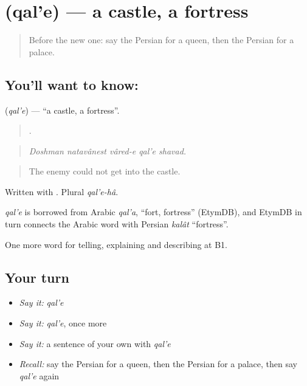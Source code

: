 \section[\texorpdfstring{\fa{قلعه} (qal'e)}{قلعه (qal'e)}]{ (qal'e) — a castle, a fortress}

\label{lesson:FA-C350-qale}



\begin{quote}
Before the new one: say the Persian for a queen, then the Persian for a palace.
\end{quote}

\subsection*{You'll want to know: }
\textbf{} (\emph{qal'e}) — \textquotedblleft{}a castle, a fortress\textquotedblright{}.

\begin{quote}
    .
\end{quote}

\begin{quote}
\emph{Doshman natavânest vâred-e qal'e shavad.}
\end{quote}

\begin{quote}
The enemy could not get into the castle.
\end{quote}

Written with . Plural \emph{qal'e-hâ}.

\begin{cousinweb}
\emph{qal'e} is borrowed from Arabic \emph{qal'a}, \textquotedblleft{}fort, fortress\textquotedblright{} (EtymDB), and EtymDB in turn connects the Arabic word with Persian \emph{kalât} \textquotedblleft{}fortress\textquotedblright{}.
\end{cousinweb}

\begin{grammarlens}[title={What you've built}]
One more word for telling, explaining and describing at B1.
\end{grammarlens}

\subsection*{Your turn}
\begin{itemize}
\raggedright
  \item \emph{Say it:} \emph{qal'e}
  \item \emph{Say it:} \emph{qal'e}, once more
  \item \emph{Say it:} a sentence of your own with \emph{qal'e}
  \item \emph{Recall:} say the Persian for a queen, then the Persian for a palace, then say \emph{qal'e} again
\end{itemize}

